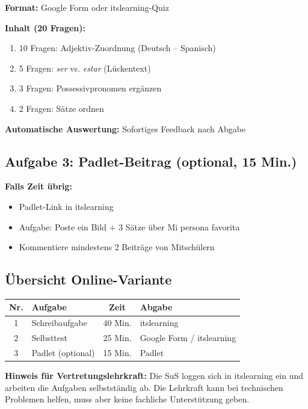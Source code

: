 \documentclass[11pt,a4paper]{article}
\begin{document}
\textbf{Format:} Google Form oder itslearning-Quiz

\textbf{Inhalt (20 Fragen):}
\begin{enumerate}
    \item 10 Fragen: Adjektiv-Zuordnung (Deutsch -- Spanisch)
    \item 5 Fragen: \textit{ser} vs. \textit{estar} (Lückentext)
    \item 3 Fragen: Possessivpronomen ergänzen
    \item 2 Fragen: Sätze ordnen
\end{enumerate}

\textbf{Automatische Auswertung:} Sofortiges Feedback nach Abgabe

\subsection{Aufgabe 3: Padlet-Beitrag (optional, 15 Min.)}

\textbf{Falls Zeit übrig:}
\begin{itemize}
    \item Padlet-Link in itslearning
    \item Aufgabe: Poste ein Bild + 3 Sätze über \glqq{}Mi persona favorita\grqq{}
    \item Kommentiere mindestens 2 Beiträge von Mitschülern
\end{itemize}

\subsection{Übersicht Online-Variante}

\begin{center}
\begin{tabular}{|c|l|c|l|}
\hline
\textbf{Nr.} & \textbf{Aufgabe} & \textbf{Zeit} & \textbf{Abgabe} \\
\hline
1 & Schreibaufgabe & 40 Min. & itslearning \\
\hline
2 & Selbsttest & 25 Min. & Google Form / itslearning \\
\hline
3 & Padlet (optional) & 15 Min. & Padlet \\
\hline
\end{tabular}
\end{center}

\textbf{Hinweis für Vertretungslehrkraft:} Die SuS loggen sich in itslearning ein und arbeiten die Aufgaben selbstständig ab. Die Lehrkraft kann bei technischen Problemen helfen, muss aber keine fachliche Unterstützung geben.
\end{document}
